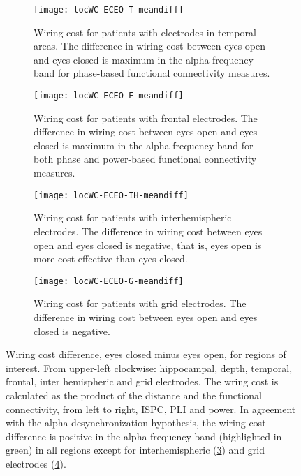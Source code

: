 \documentclass[11pt, onecolumn]{article}
\begin{document}
\begin{figure}[p]
\begin{adjustbox}{minipage=\linewidth,scale=0.9}
  
  \begin{subfigure}[t]{0.5\linewidth}
    \centering
    \texttt{[image: locWC-ECEO-T-meandiff]} 
    \caption{Wiring cost for patients with electrodes in temporal areas. The difference in wiring cost between eyes open and eyes closed is maximum in the alpha frequency band for phase-based functional connectivity measures.} 
    \label{figi-2:c} 
  \end{subfigure} 
  \hspace{1ex}
 \begin{subfigure}[t]{0.5\linewidth}
    \centering
    \texttt{[image: locWC-ECEO-F-meandiff]} 
    \caption{Wiring cost for patients with frontal electrodes. The difference in wiring cost between eyes open and eyes closed is maximum in the alpha frequency band for both phase and power-based functional connectivity measures.} 
    \label{figi-2:d} 
  \end{subfigure} 
    \begin{subfigure}[t]{ 0.5\linewidth}
    \centering
    \texttt{[image: locWC-ECEO-IH-meandiff]} 
    \caption{Wiring cost for patients with interhemispheric electrodes. The difference in wiring cost between eyes open and eyes closed is negative, that is, eyes open is more cost effective than eyes closed.} 
    \label{figi-2:e} 
  \end{subfigure}%
    \hspace{1ex}
   \begin{subfigure}[t]{0.5\linewidth}
    \centering
    \texttt{[image: locWC-ECEO-G-meandiff]} 
    \caption{Wiring cost for patients with grid electrodes. The difference in wiring cost between eyes open and eyes closed is negative.} 
    \label{figi-2:f} 
  \end{subfigure} \newpage
  \caption{Wiring cost difference, eyes closed minus eyes open, for regions of interest. From upper-left clockwise: hippocampal, depth, temporal, frontal, inter hemispheric and grid electrodes. The wring cost is calculated as the product of the distance and the functional connectivity, from left to right, ISPC, PLI and power. In agreement with the alpha desynchronization hypothesis, the wiring cost difference is positive in the alpha frequency band (highlighted in green) in all regions except for interhemispheric (\ref{figi-2:e}) and grid electrodes (\ref{figi-2:f}).}
  \label{fig:figi-2} 
  \end{adjustbox}
\end{figure}
 
\end{document}
